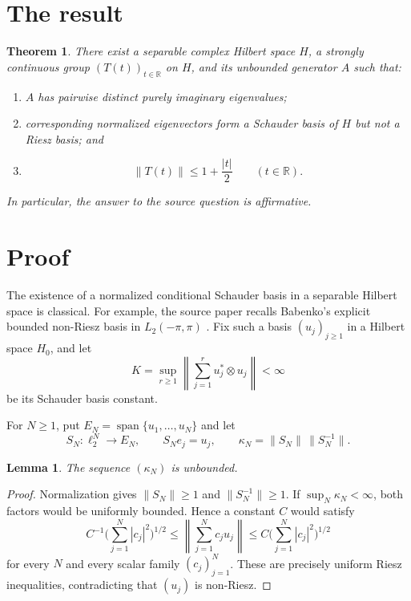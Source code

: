 \documentclass[11pt]{article}
\newtheorem{theorem}{Theorem}
\newtheorem{lemma}{Lemma}
\begin{document}
\section{The result}

\begin{theorem}\label{thm:main}
There exist a separable complex Hilbert space $H$, a strongly continuous group
$(T(t))_{t\in\mathbb R}$ on $H$, and its unbounded generator $A$ such that:
\begin{enumerate}[label=\textup{(\roman*)}]
\item $A$ has pairwise distinct purely imaginary eigenvalues;
\item corresponding normalized eigenvectors form a Schauder basis of $H$ but
      not a Riesz basis; and
\item
\[
             \|T(t)\|\le 1+\frac{|t|}{2}\qquad(t\in\mathbb R).
\]
\end{enumerate}
In particular, the answer to the source question is affirmative.
\end{theorem}

\section{Proof}

The existence of a normalized conditional Schauder basis in a separable
Hilbert space is classical.  For example, the source paper
\cite[p.~7]{SklyarMarchenko} recalls Babenko's explicit bounded non-Riesz basis
in $L_2(-\pi,\pi)$ \cite{Babenko}.  Fix such a basis $(u_j)_{j\ge1}$ in a
Hilbert space $H_0$, and let
\[
 K=\sup_{r\ge1}\left\|\sum_{j=1}^r u_j^*\otimes u_j\right\|<\infty
\]
be its Schauder basis constant.

For $N\ge1$, put $E_N=\operatorname{span}\{u_1,\ldots,u_N\}$ and let
\[
 S_N:\ell_2^N\longrightarrow E_N,\qquad S_N e_j=u_j,
 \qquad \kappa_N=\|S_N\|\,\|S_N^{-1}\|.
\]

\begin{lemma}\label{lem:condition}
The sequence $(\kappa_N)$ is unbounded.
\end{lemma}

\begin{proof}
Normalization gives $\|S_N\|\ge1$ and $\|S_N^{-1}\|\ge1$.  If
$\sup_N\kappa_N<\infty$, both factors would be uniformly bounded.  Hence a
constant $C$ would satisfy
\[
 C^{-1}\Big(\sum_{j=1}^N|c_j|^2\Big)^{1/2}
 \le \left\|\sum_{j=1}^N c_j u_j\right\|
 \le C\Big(\sum_{j=1}^N|c_j|^2\Big)^{1/2}
\]
for every $N$ and every scalar family $(c_j)_{j=1}^N$.  These are precisely
uniform Riesz inequalities, contradicting that $(u_j)$ is non-Riesz.
\end{proof}
\end{document}
